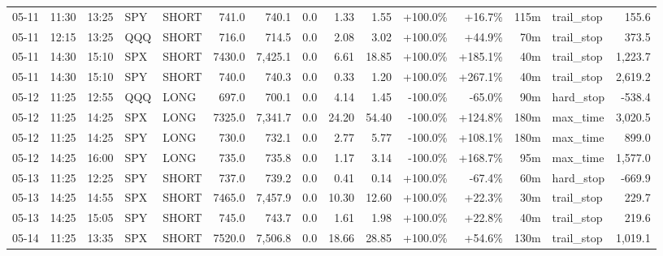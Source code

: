 \documentclass[11pt,a4paper,twoside]{article}
\begin{document}
\begin{landscape}
\begin{center}
\begin{longtable}{>{\color{txtmain}}l l l l l r r r r r r r r >{\color{txtmain}}l r}
05-11 & 11:30 & 13:25 & SPY & SHORT & 741.0 & 740.1 & 0.0 & 1.33 & 1.55 & \textcolor{wingreen}{+100.0\%} & \textcolor{wingreen}{+16.7\%} & 115m & trail\_stop & \textcolor{wingreen}{155.6} \\
05-11 & 12:15 & 13:25 & QQQ & SHORT & 716.0 & 714.5 & 0.0 & 2.08 & 3.02 & \textcolor{wingreen}{+100.0\%} & \textcolor{wingreen}{+44.9\%} & 70m & trail\_stop & \textcolor{wingreen}{373.5} \\
05-11 & 14:30 & 15:10 & SPX & SHORT & 7430.0 & 7,425.1 & 0.0 & 6.61 & 18.85 & \textcolor{wingreen}{+100.0\%} & \textcolor{wingreen}{+185.1\%} & 40m & trail\_stop & \textcolor{wingreen}{1,223.7} \\
05-11 & 14:30 & 15:10 & SPY & SHORT & 740.0 & 740.3 & 0.0 & 0.33 & 1.20 & \textcolor{wingreen}{+100.0\%} & \textcolor{wingreen}{+267.1\%} & 40m & trail\_stop & \textcolor{wingreen}{2,619.2} \\
05-12 & 11:25 & 12:55 & QQQ & LONG & 697.0 & 700.1 & 0.0 & 4.14 & 1.45 & \textcolor{lossred}{-100.0\%} & \textcolor{lossred}{-65.0\%} & 90m & hard\_stop & \textcolor{lossred}{-538.4} \\
05-12 & 11:25 & 14:25 & SPX & LONG & 7325.0 & 7,341.7 & 0.0 & 24.20 & 54.40 & \textcolor{lossred}{-100.0\%} & \textcolor{wingreen}{+124.8\%} & 180m & max\_time & \textcolor{wingreen}{3,020.5} \\
05-12 & 11:25 & 14:25 & SPY & LONG & 730.0 & 732.1 & 0.0 & 2.77 & 5.77 & \textcolor{lossred}{-100.0\%} & \textcolor{wingreen}{+108.1\%} & 180m & max\_time & \textcolor{wingreen}{899.0} \\
05-12 & 14:25 & 16:00 & SPY & LONG & 735.0 & 735.8 & 0.0 & 1.17 & 3.14 & \textcolor{lossred}{-100.0\%} & \textcolor{wingreen}{+168.7\%} & 95m & max\_time & \textcolor{wingreen}{1,577.0} \\
05-13 & 11:25 & 12:25 & SPY & SHORT & 737.0 & 739.2 & 0.0 & 0.41 & 0.14 & \textcolor{wingreen}{+100.0\%} & \textcolor{lossred}{-67.4\%} & 60m & hard\_stop & \textcolor{lossred}{-669.9} \\
05-13 & 14:25 & 14:55 & SPX & SHORT & 7465.0 & 7,457.9 & 0.0 & 10.30 & 12.60 & \textcolor{wingreen}{+100.0\%} & \textcolor{wingreen}{+22.3\%} & 30m & trail\_stop & \textcolor{wingreen}{229.7} \\
05-13 & 14:25 & 15:05 & SPY & SHORT & 745.0 & 743.7 & 0.0 & 1.61 & 1.98 & \textcolor{wingreen}{+100.0\%} & \textcolor{wingreen}{+22.8\%} & 40m & trail\_stop & \textcolor{wingreen}{219.6} \\
05-14 & 11:25 & 13:35 & SPX & SHORT & 7520.0 & 7,506.8 & 0.0 & 18.66 & 28.85 & \textcolor{wingreen}{+100.0\%} & \textcolor{wingreen}{+54.6\%} & 130m & trail\_stop & \textcolor{wingreen}{1,019.1} \\

\end{longtable}
\end{center}
\end{landscape}
\end{document}
